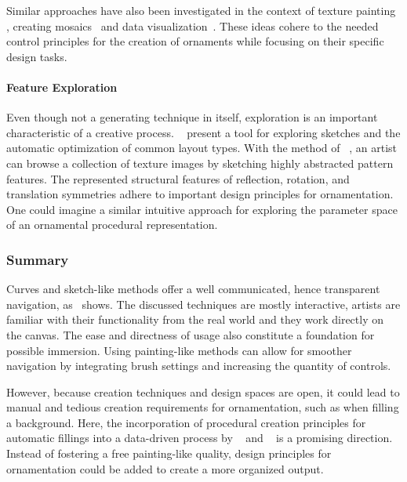 Similar approaches have also been investigated in the context of texture painting \cite{lukac_2013_pft}, creating mosaics~\cite{igarashi_2010_dde,abdrashitov_2014_msi} and data visualization~\cite{xia_2018_ddc}. These ideas cohere to the needed control principles for the creation of ornaments while focusing on their specific design tasks. 

\paragraph{Feature Exploration} Even though not a generating technique in itself, exploration is an important characteristic of a creative process. \citeauthor*{todi_2016_sse}~\cite{todi_2016_sse} present a tool for exploring sketches and the automatic optimization of common layout types. With the method of \citeauthor*{chen_2016_msi}~\cite{chen_2016_msi}, an artist can browse a collection of texture images by sketching highly abstracted pattern features. The represented structural features of reflection, rotation, and translation symmetries adhere to important design principles for ornamentation. One could imagine a similar intuitive approach for exploring the parameter space of an ornamental procedural representation.



\subsubsection{Summary}
\label{subsec:analysis_curves_sketches_painting_summary}

Curves and sketch-like methods offer a well communicated, hence transparent navigation, as~ shows. The discussed techniques are mostly interactive, artists are familiar with their functionality from the real world and they work directly on the canvas. The ease and directness of usage also constitute a foundation for possible immersion. Using painting-like methods can allow for smoother navigation by integrating brush settings and increasing the quantity of controls.

However, because creation techniques and design spaces are open, it could lead to manual and tedious creation requirements for ornamentation, such as when filling a background. Here, the incorporation of procedural creation principles for automatic fillings into a data-driven process by \citeauthor*{kazi_2012_vit}~\cite{kazi_2012_vit} and \citeauthor*{xing_2014_apr}~\cite{xing_2014_apr} is a promising direction. Instead of fostering a free painting-like quality, design principles for ornamentation could be added to create a more organized output.



